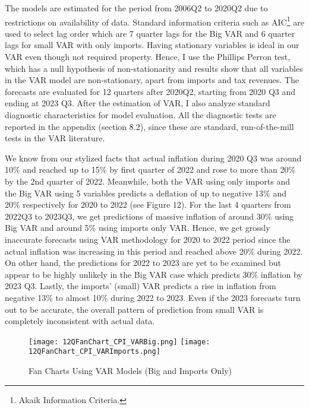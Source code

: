 \documentclass[12pt]{article}
\newcommand{\1}{\mathbbm 1}
\begin{document}
		The models are estimated for the period from 2006Q2 to 2020Q2 due to restrictions on availability of data. Standard information criteria such as AIC\footnote{Akaik Information Criteria.} are used to select lag order which are 7 quarter lags for the Big VAR and 6 quarter lags for small VAR with only imports. Having stationary variables is ideal in our VAR even though not required property. Hence, I use the Phillips Perron test, which has a null hypothesis of non-stationarity and results show that all variables in the VAR model are non-stationary, apart from imports and tax revenues. The forecasts are evaluated for 12 quarters after 2020Q2, starting from 2020 Q3 and ending at 2023 Q3. After the estimation of VAR, I also analyze standard diagnostic characteristics for model evaluation. All the diagnostic tests are reported in the appendix (section 8.2), since these are standard, run-of-the-mill tests in the VAR literature.
		
		
		We know from our stylized facts that actual inflation during 2020 Q3 was around 10\% and reached up to 15\% by first quarter of 2022 and rose to more than 20\% by the 2nd quarter of 2022. Meanwhile, both the VAR using only imports and the Big VAR using 5 variables predicts a deflation of up to negative 13\% and 20\% respectively for 2020 to 2022 (see Figure 12). For the last 4 quarters from 2022Q3 to 2023Q3, we get predictions of massive inflation of around 30\% using Big VAR and around 5\% using imports only VAR.  Hence, we get grossly inaccurate forecasts using VAR methodology for 2020 to 2022 period since the actual inflation was increasing in this period and reached above 20\% during 2022. On other hand, the predictions for 2022 to 2023 are yet to be examined but appear to be highly unlikely in the Big VAR case which predicts 30\% inflation by 2023 Q3. Lastly, the imports' (small) VAR predicts a rise in inflation from negative 13\% to almost 10\% during 2022 to 2023. Even if the 2023 forecasts turn out to be accurate, the overall pattern of prediction from small VAR is completely inconsistent with actual data.
		
		
	
	\begin{figure}[H]
		\texttt{[image: 12QFanChart\_CPI\_VARBig.png]}
		\hfill
		\texttt{[image: 12QFanChart\_CPI\_VARImports.png]}
		\hfill
		\caption{Fan Charts Using VAR Models (Big and Imports Only)}
	\end{figure}
	
\end{document}
